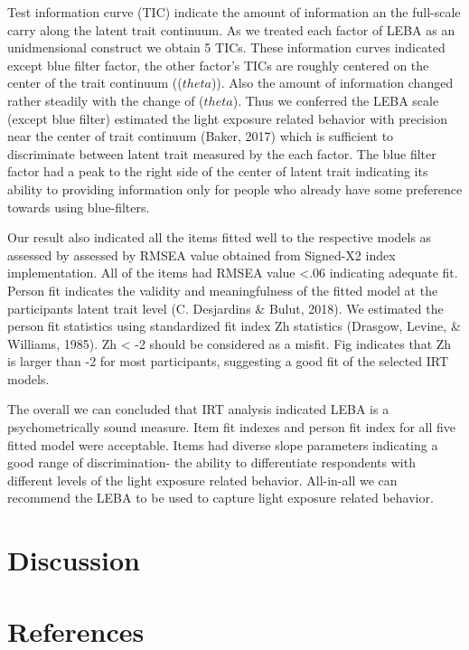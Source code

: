 \documentclass[
  english,
  man]{apa6}
\begin{document}
Test information curve (TIC) indicate the amount of information an the full-scale carry along the latent trait continuum. As we treated each factor of LEBA as an unidmensional construct we obtain 5 TICs. These information curves indicated except blue filter factor, the other factor's TICs are roughly centered on the center of the trait continuum ((\(theta\))). Also the amount of information changed rather steadily with the change of (\(theta\)). Thus we conferred the LEBA scale (except blue filter) estimated the light exposure related behavior with precision near the center of trait continuum (Baker, 2017) which is sufficient to discriminate between latent trait measured by the each factor. The blue filter factor had a peak to the right side of the center of latent trait indicating its ability to providing information only for people who already have some preference towards using blue-filters.

Our result also indicated all the items fitted well to the respective models as assessed by assessed by RMSEA value obtained from Signed-X2 index implementation. All of the items had RMSEA value \textless.06 indicating adequate fit. Person fit indicates the validity and meaningfulness of the fitted model at the participants latent trait level (C. Desjardins \& Bulut, 2018). We estimated the person fit statistics using standardized fit index Zh statistics (Drasgow, Levine, \& Williams, 1985). Zh \textless{} -2 should be considered as a misfit. Fig indicates that Zh is larger than -2 for most participants, suggesting a good fit of the selected IRT models.

The overall we can concluded that IRT analysis indicated LEBA is a psychometrically sound measure. Item fit indexes and person fit index for all five fitted model were acceptable. Items had diverse slope parameters indicating a good range of discrimination- the ability to differentiate respondents with different levels of the light exposure related behavior. All-in-all we can recommend the LEBA to be used to capture light exposure related behavior.

\hypertarget{discussion}{%
\section{Discussion}\label{discussion}}

\newpage

\hypertarget{references}{%
\section{References}\label{references}}
\end{document}
